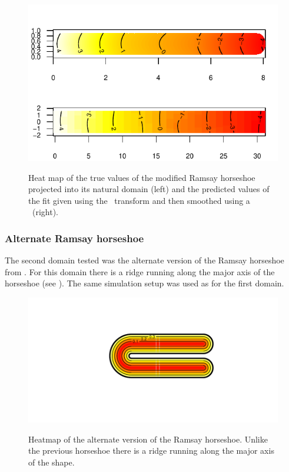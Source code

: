 \begin{figure}
\centering
\includegraphics{sc/figs/hsvisgam.pdf} \\
\caption{Heat map of the true values of the modified Ramsay horseshoe projected into its natural domain (left) and the predicted values of the fit given using the \sch\ transform and then smoothed using a \tprs\ (right).}
\label{hsvisgam}
\end{figure}

\subsubsection{Alternate Ramsay horseshoe}
\label{sc-alt-horsehoe}
The second domain tested was the alternate version of the Ramsay horseshoe from . For this domain there is a ridge running along the major axis of the horseshoe (see ). The same simulation setup was used as for the first domain.

\begin{figure}
\centering
\includegraphics[trim=0.5in 1in 0in 0.5in]{sc/figs/altramsayhorseshoe.pdf} \\
\caption{Heatmap of the alternate version of the Ramsay horseshoe. Unlike the previous horseshoe there is a ridge running along the major axis of the shape.}
\label{altramsayhorseshoe}
\end{figure}

